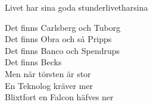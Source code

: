 \begin{song}{Livet har sina goda stunder}{livetharsina}
\begin{vers}
Det finns Carlsberg och Tuborg\\
Det finns Obra och så Pripps\\
Det finns Banco och Spendrups\\
Det finns Becks\\
Men när törsten är stor\\
En Teknolog kräver mer\\
Blixtfort en Falcon häfves ner\\
\end{vers}
\end{song}
